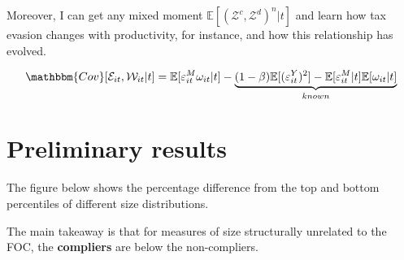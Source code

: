 \documentclass[
  12pt]{article}
\theoremstyle{definition}
\theoremstyle{remark}
\begin{document}
Moreover, I can get any mixed moment
\(\mathbb{E}[(\mathcal{Z}^c, \mathcal{Z}^d)^n|t]\) and learn how tax
evasion changes with productivity, for instance, and how this
relationship has evolved.

\[
\mathbbm{Cov}[\mathcal{E}_{it},\mathcal{W}_{it}|t]=\mathbb{E}[\varepsilon^M_{it}\omega_{it}|t]
-\underbrace{
(1-\beta)\mathbb{E}[(\varepsilon^{Y}_{it})^2]-\mathbb{E}[\varepsilon^M_{it}|t]\mathbb{E}[\omega_{it}|t]}_{
known
}
\]

\hypertarget{preliminary-results}{%
\section{Preliminary results}\label{preliminary-results}}

The figure below shows the percentage difference from the top and bottom
percentiles of different size distributions.

The main takeaway is that for measures of size structurally unrelated to
the FOC, the \textbf{compliers} are below the non-compliers.

\newpage{}
\end{document}

